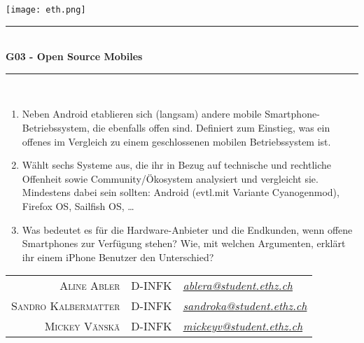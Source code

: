 \begin{titlepage}

	\begin{flushright}
		{\texttt{[image: eth.png]}}
	\end{flushright}
	
	\begin{center}
		\vspace*{2\baselineskip}
		\rule{\linewidth}{0.5mm} \\[3mm]
		\textbf{\huge G03 - Open Source Mobiles} \\
		\rule{\linewidth}{0.5mm} \\
		\vspace{\baselineskip}
	\end{center}
	
	\begin{large}
	
		\begin{enumerate}[leftmargin=*]
		    \item Neben Android etablieren sich (langsam) andere mobile Smartphone-Betriebssystem, die ebenfalls offen sind. Definiert zum Einstieg, was ein offenes im Vergleich zu einem geschlossenen mobilen Betriebssystem ist.
	
		    \item Wählt sechs Systeme aus, die ihr in Bezug auf technische und rechtliche Offenheit sowie Community/Ökosystem analysiert und vergleicht sie. Mindestens dabei sein sollten: Android (evtl.\@ mit Variante Cyanogenmod), Firefox OS, Sailfish OS, \ldots
	
		    \item Was bedeutet es für die Hardware-Anbieter und die Endkunden, wenn offene Smartphones zur Verfügung stehen? Wie, mit welchen Argumenten, erklärt ihr einem iPhone Benutzer den Unterschied?
		\end{enumerate}
	
		\begin{center}
		
			\vfill
			\begin{tabular}{r@{, }c@{, }l}
				\textsc{Aline Abler} &D-INFK & \href{mailto:ablera@student.ethz.ch}{\emph{ablera@student.ethz.ch}} \\
				\textsc{Sandro Kalbermatter} &D-INFK & \href{mailto:sandroka@student.ethz.ch}{\emph{sandroka@student.ethz.ch}} \\
				\textsc{Mickey Vänskä} & D-INFK & \href{mailto:mickeyv@student.ethz.ch}{\emph{mickeyv@student.ethz.ch}} \\
			\end{tabular}
			\vspace{2\baselineskip}
	

\end{center}
\end{large}
\end{titlepage}
